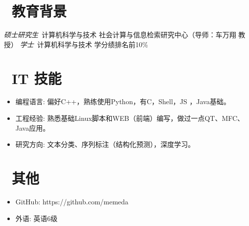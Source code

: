 \documentclass{resume}
\begin{document}
\section{\faGraduationCap\  教育背景}
\textit{硕士研究生}\ 计算机科学与技术 \hfill 社会计算与信息检索研究中心（导师：车万翔 教授）
\textit{学士}\ 计算机科学与技术 \hfill 学分绩排名前10\%


\section{\faCogs\ IT 技能}
\begin{itemize}[parsep=0.5ex]
  \item 编程语言: 偏好C++，熟练使用Python，有C，Shell，JS ，Java基础。
  \item 工程经验: 熟悉基础Linux脚本和WEB（前端）编写，做过一点QT、MFC、Java应用。
  \item 研究方向: 文本分类、序列标注（结构化预测），深度学习。
\end{itemize}

\section{\faInfo\ 其他}
\begin{itemize}[parsep=0.5ex]
  \item GitHub: https://github.com/memeda
  \item 外语: 英语6级
\end{itemize}


%
%
\end{document}

